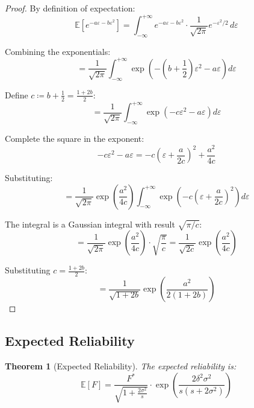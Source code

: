 \documentclass[11pt,a4paper]{article}
\newtheorem{theorem}{Theorem}
\theoremstyle{definition}
\newcommand{\E}{\mathbb{E}}
\begin{document}
\begin{proof}
By definition of expectation:
\begin{equation}
    \E\left[e^{-a\varepsilon - b\varepsilon^2}\right] = \int_{-\infty}^{+\infty} e^{-a\varepsilon - b\varepsilon^2} \cdot \frac{1}{\sqrt{2\pi}} e^{-\varepsilon^2/2} \, d\varepsilon
\end{equation}

Combining the exponentials:
\begin{equation}
    = \frac{1}{\sqrt{2\pi}} \int_{-\infty}^{+\infty} \exp\left(-\left(b + \frac{1}{2}\right)\varepsilon^2 - a\varepsilon\right) d\varepsilon
\end{equation}

Define $c \coloneqq b + \frac{1}{2} = \frac{1 + 2b}{2}$:
\begin{equation}
    = \frac{1}{\sqrt{2\pi}} \int_{-\infty}^{+\infty} \exp\left(-c\varepsilon^2 - a\varepsilon\right) d\varepsilon
\end{equation}

Complete the square in the exponent:
\begin{equation}
    -c\varepsilon^2 - a\varepsilon = -c\left(\varepsilon + \frac{a}{2c}\right)^2 + \frac{a^2}{4c}
\end{equation}

Substituting:
\begin{equation}
    = \frac{1}{\sqrt{2\pi}} \exp\left(\frac{a^2}{4c}\right) \int_{-\infty}^{+\infty} \exp\left(-c\left(\varepsilon + \frac{a}{2c}\right)^2\right) d\varepsilon
\end{equation}

The integral is a Gaussian integral with result $\sqrt{\pi/c}$:
\begin{equation}
    = \frac{1}{\sqrt{2\pi}} \exp\left(\frac{a^2}{4c}\right) \cdot \sqrt{\frac{\pi}{c}} = \frac{1}{\sqrt{2c}} \exp\left(\frac{a^2}{4c}\right)
\end{equation}

Substituting $c = \frac{1 + 2b}{2}$:
\begin{equation}
    = \frac{1}{\sqrt{1 + 2b}} \exp\left(\frac{a^2}{2(1 + 2b)}\right)
\end{equation}
\end{proof}

\subsection{Expected Reliability}

\begin{theorem}[Expected Reliability]
\label{thm:expected-F}
The expected reliability is:
\begin{equation}
    \E[F] = \frac{F^*}{\sqrt{1 + \frac{2\sigma^2}{s}}} \cdot \exp\left(\frac{2\delta^2\sigma^2}{s(s + 2\sigma^2)}\right)
\end{equation}
\end{theorem}
\end{document}
